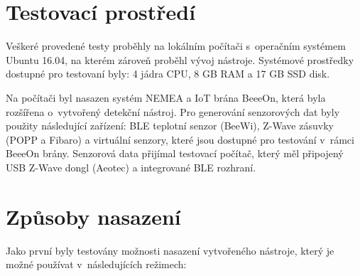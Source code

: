 
\section{Testovací prostředí}
Veškeré provedené testy proběhly na lokálním počítači s~operačním systémem Ubuntu 16.04,
na kterém zároveň proběhl vývoj nástroje. Systémové
prostředky dostupné pro testovaní byly: 4 jádra CPU, 8 GB RAM a 17 GB SSD disk.

Na počítači byl nasazen systém NEMEA a IoT brána BeeeOn, která byla rozšířena o~vytvořený detekční 
nástroj. Pro generování senzorových dat byly použity následující zařízení: BLE teplotní senzor (BeeWi), 
Z-Wave zásuvky (POPP a Fibaro) a virtuální senzory, které jsou dostupné pro testování
v~rámci BeeeOn brány.
Senzorová data přijímal testovací počítač, který měl připojený USB Z-Wave dongl (Aeotec) a integrované
BLE rozhraní.

\section{Způsoby nasazení}
Jako první byly testovány možnosti nasazení vytvořeného nástroje, který je možné používat
v~následujících režimech:

